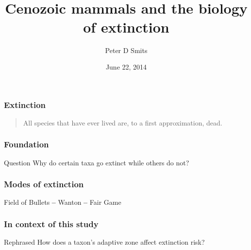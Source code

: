 \documentclass{beamer}
\title{Cenozoic mammals and the biology of extinction}
\author{Peter D Smits}
\institute{Committee on Evolutionary Biology, University of Chicago}
\date{June 22, 2014}
\begin{document}
\begin{frame}
  \maketitle
\end{frame}

\begin{frame}
  \frametitle{Extinction}
  \begin{quotation}
    All species that have ever lived are, to a first approximation, dead.

    \tiny{}
  \end{quotation}
\end{frame}

\begin{frame}
  \frametitle{Foundation}
  \begin{alertblock}{Question}
    Why do certain taxa go extinct while others do not?
  \end{alertblock}
\end{frame}

\begin{frame}
  \frametitle{Modes of extinction}

   Field of Bullets 
   \textbf{--} 
   Wanton 
   \textbf{--} 
   Fair Game 

  \bigskip

  \tiny{}

\end{frame}

\begin{frame}
  \frametitle{In context of this study}
  \begin{block}{Rephrased}
    How does a taxon's \alert{adaptive zone} affect \alert{extinction risk?}
  \end{block}
\end{frame}
\end{document}
